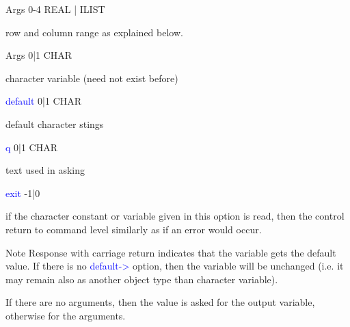 \vspace{0.3cm}
\hline
\vspace{0.3cm}
\noindent Args \tabto{3cm} 0-4 \tabto{5cm}  REAL | ILIST \tabto{7cm}
\begin{changemargin}{3cm}{0cm}
\noindent row and column range as explained below.

\end{changemargin}
\vspace{0.3cm}
\hline
\vspace{0.3cm}
\noindent Args  \tabto{3cm}  0|1  \tabto{5cm}  CHAR  \tabto{7cm}
\begin{changemargin}{3cm}{0cm}
\noindent  character variable (need not exist before)

\end{changemargin}
\vspace{0.3cm}
\hline
\vspace{0.3cm}
\noindent \textcolor{blue}{default} \tabto{3cm} 0|1 \tabto{5cm}  CHAR  \tabto{7cm}
\begin{changemargin}{3cm}{0cm}
\noindent  default character stings
\end{changemargin}
\vspace{0.3cm}
\hline
\vspace{0.3cm}
\noindent \textcolor{blue}{q}  \tabto{3cm}  0|1  \tabto{5cm}  CHAR  \tabto{7cm}
\begin{changemargin}{3cm}{0cm}
\noindent text used in asking
\end{changemargin}
\vspace{0.3cm}
\hline
\vspace{0.3cm}
\noindent \textcolor{blue}{exit} \tabto{3cm}  -1|0 \tabto{5cm}    \tabto{7cm}
\begin{changemargin}{3cm}{0cm}
\noindent  if the character constant or variable given in this option is read, then the control
return to command level similarly as if an error would occur.
\end {changemargin}
\hline
\vspace{0.2cm}
\begin{note}
Note
Response with carriage return indicates that the variable gets the default value. If there is no
\textcolor{blue}{default->} option, then the variable will be unchanged (i.e. it may remain also as another
object type than character variable).
\end{note}
\begin{note}
If there are no arguments, then the value is asked for the output variable, otherwise for
the arguments.
\end{note}
